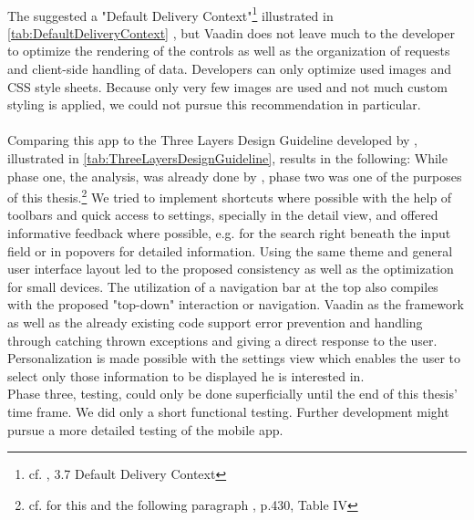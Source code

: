 \\
The \cite{WorldWideWebConsortium.2008} suggested a "Default Delivery Context"\footnote{cf. \cite{WorldHealthOrganization.2011}, 3.7 Default Delivery Context} illustrated in \ref{tab:DefaultDeliveryContext} , but Vaadin does not leave much to the developer to optimize the rendering of the controls as well as the organization of requests and client-side handling of data. Developers can only optimize used images and CSS style sheets. Because only very few images are used and not much custom styling is applied, we could not pursue this recommendation in particular.
\\
\\
Comparing this app to the Three Layers Design Guideline developed by \cite{AyobNurulZakiahbinti.2009}, illustrated in \ref{tab:ThreeLayersDesignGuideline}, results in the following: While phase one, the analysis, was already done by \cite{Dehling.2012}, phase two was one of the purposes of this thesis.\footnote{cf. for this and the following paragraph \cite{AyobNurulZakiahbinti.2009}, p.430, Table IV} We tried to implement shortcuts where possible with the help of toolbars and quick access to settings, specially in the detail view, and offered informative feedback where possible, e.g. for the search right beneath the input field or in popovers for detailed information. Using the same theme and general user interface layout led to the proposed consistency as well as the optimization for small devices. The utilization of a navigation bar at the top also compiles with the proposed "top-down" interaction or navigation. Vaadin as the framework as well as the already existing code support error prevention and handling through catching thrown exceptions and giving a direct response to the user. Personalization is made possible with the settings view which enables the user to select only those information to be displayed he is interested in.
\\
Phase three, testing, could only be done superficially until the end of this thesis' time frame. We did only a short functional testing. Further development might pursue a more detailed testing of the mobile app.
